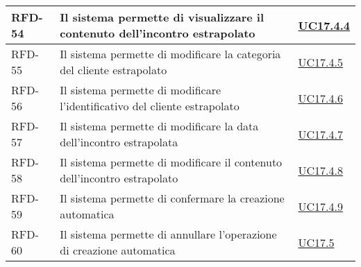 \begin{table}
\begin{tabularx}{\textwidth}{lXl}
    \hline
    RFD-54 \label{RFD-54} & Il sistema permette di visualizzare il contenuto dell'incontro estrapolato & \hyperref[UC17.4.4]{UC17.4.4} \\
    \hline
    RFD-55 \label{RFD-55} & Il sistema permette di modificare la categoria del cliente estrapolato & \hyperref[UC17.4.5]{UC17.4.5} \\
    \hline
    RFD-56 \label{RFD-56} & Il sistema permette di modificare l'identificativo del cliente estrapolato & \hyperref[UC17.4.6]{UC17.4.6} \\
    \hline
    RFD-57 \label{RFD-57} & Il sistema permette di modificare la data dell'incontro estrapolata & \hyperref[UC17.4.7]{UC17.4.7} \\
    \hline
    RFD-58 \label{RFD-58} & Il sistema permette di modificare il contenuto dell'incontro estrapolato & \hyperref[UC17.4.8]{UC17.4.8} \\
    \hline
    RFD-59 \label{RFD-59} & Il sistema permette di confermare la creazione automatica & \hyperref[UC17.4.9]{UC17.4.9} \\
    \hline
    RFD-60 \label{RFD-60} & Il sistema permette di annullare l'operazione di creazione automatica & \hyperref[UC17.5]{UC17.5} \\
    \hline
\end{tabularx}
\end{table}

\clearpage

